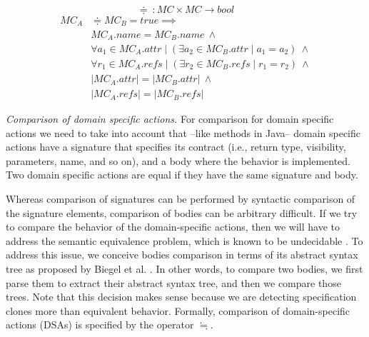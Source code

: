 \begin{equation}
  \doteqdot~: MC \times MC \rightarrow bool
\end{equation}
\vspace{-1mm}
\begin{equation}
\begin{split}
  MC_{A} &\doteqdot MC_{B} = true \implies \\
   & MC_{A}.name = MC_{B}.name ~ \wedge \\
   & \forall a_1 \in MC_{A}.attr \mid (\exists a_2 \in MC_{B}.attr \mid a_1 = a_2) ~ \wedge \\
   & \forall r_1 \in MC_{A}.refs \mid (\exists r_2 \in MC_{B}.refs \mid r_1 = r_2) ~ \wedge \\
   & |MC_{A}.attr| = |MC_{B}.attr| ~ \wedge \\
   & |MC_{A}.refs| = |MC_{B}.refs|
  \end{split}
\end{equation}

\vspace{2mm}
\textit{Comparison of domain specific actions.} For comparison for domain specific actions we need to take into account that --like methods in Java-- domain specific actions have a signature that specifies its contract (i.e., return type, visibility, parameters, name, and so on), and a body where the behavior is implemented. Two domain specific actions are equal if they have the same signature and body.

Whereas comparison of signatures can be performed by syntactic comparison of the signature elements, comparison of bodies can be arbitrary difficult. If we try to compare the behavior of the domain-specific actions, then we will have to address the semantic equivalence problem, which is known to be undecidable \cite{Lucanu:2013}. To address this issue, we conceive bodies comparison in terms of its abstract syntax tree as proposed by Biegel et al. \cite{Biegel:2010}. In other words, to compare two bodies, we first parse them to extract their abstract syntax tree, and then we compare those trees. Note that this decision makes sense because we are detecting specification clones more than equivalent behavior. Formally, comparison of domain-specific actions (DSAs) is specified by the operator $\fallingdotseq$.  

